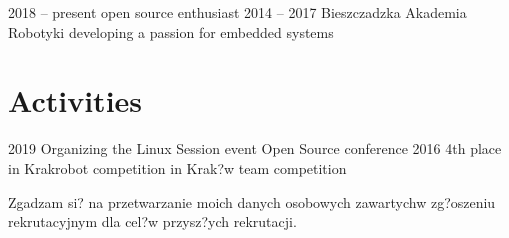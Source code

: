 \documentclass[]{cv-style}
\begin{document}
\begin{entrylist}
\entry
{2018 -- present}
{}
{open source enthusiast}
{\vspace{0.4cm}}
\entry
{2014 -- 2017}
{\quad Bieszczadzka Akademia Robotyki}
{developing a passion for embedded systems}
{\vspace{0.3cm}}

\end{entrylist}


\section{Activities}

\begin{entrylist}
\entry
{2019}
{Organizing the Linux Session event}
{Open Source conference}
{}
\entry
{2016}
{4th place in Krakrobot competition in Krak?w}
{team competition}


\end{entrylist}


\vspace{4cm}



{\footnotesize Zgadzam si? na przetwarzanie moich danych osobowych zawartych\newline w  zg?oszeniu rekrutacyjnym dla cel?w przysz?ych rekrutacji.}
\end{document}
